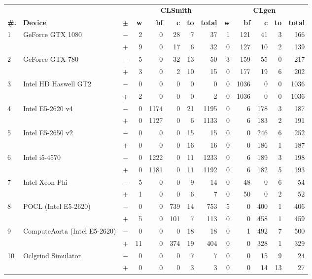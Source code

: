   \begin{tabular}{lll | rrrrr | rrrrr }
  \toprule
  & & & \multicolumn{5}{c|}{\textbf{CLSmith}} & \multicolumn{5}{c}{\textbf{CLgen}} \\
  \textbf{\#.} & \textbf{Device} & $\pm$ &
  \textbf{w} & \textbf{bf} & \textbf{c} & \textbf{to} & \textbf{total} &
  \textbf{w} & \textbf{bf} & \textbf{c} & \textbf{to} & \textbf{total} \\
  \midrule
  \multirow{ 2}{*}{1} & \multirow{ 2}{*}{GeForce GTX 1080} & $-$ & 2 & 0 & 28 & 7 & 37       & 1 & 121 & 41 & 3 & 166 \\& & $+$ & 9 & 0 & 17 & 6 & 32 & 0 & 127 & 10 & 2 & 139 \\
\hline
\multirow{ 2}{*}{2} & \multirow{ 2}{*}{GeForce GTX 780} & $-$ & 5 & 0 & 32 & 13 & 50       & 3 & 159 & 55 & 0 & 217 \\& & $+$ & 3 & 0 & 2 & 10 & 15 & 0 & 177 & 19 & 6 & 202 \\
\hline
\multirow{ 2}{*}{3} & \multirow{ 2}{*}{Intel HD Haswell GT2} & $-$ & 0 & 0 & 0 & 0 & 0       & 0 & 1036 & 0 & 0 & 1036 \\& & $+$ & 2 & 0 & 0 & 0 & 2 & 0 & 1036 & 0 & 0 & 1036 \\
\hline
\multirow{ 2}{*}{4} & \multirow{ 2}{*}{Intel E5-2620 v4} & $-$ & 0 & 1174 & 0 & 21 & 1195       & 0 & 6 & 178 & 3 & 187 \\& & $+$ & 0 & 1127 & 0 & 6 & 1133 & 0 & 6 & 183 & 2 & 191 \\
\hline
\multirow{ 2}{*}{5} & \multirow{ 2}{*}{Intel E5-2650 v2} & $-$ & 0 & 0 & 0 & 15 & 15       & 0 & 0 & 246 & 6 & 252 \\& & $+$ & 0 & 0 & 0 & 16 & 16 & 0 & 0 & 186 & 1 & 187 \\
\hline
\multirow{ 2}{*}{6} & \multirow{ 2}{*}{Intel i5-4570} & $-$ & 0 & 1222 & 0 & 11 & 1233       & 0 & 6 & 189 & 3 & 198 \\& & $+$ & 0 & 1181 & 0 & 11 & 1192 & 0 & 6 & 182 & 5 & 193 \\
\hline
\multirow{ 2}{*}{7} & \multirow{ 2}{*}{Intel Xeon Phi} & $-$ & 5 & 0 & 0 & 9 & 14       & 0 & 48 & 0 & 6 & 54 \\& & $+$ & 1 & 0 & 0 & 6 & 7 & 0 & 50 & 0 & 2 & 52 \\
\hline
\multirow{ 2}{*}{8} & \multirow{ 2}{*}{POCL (Intel E5-2620)} & $-$ & 0 & 0 & 739 & 14 & 753       & 5 & 0 & 400 & 1 & 406 \\& & $+$ & 5 & 0 & 101 & 7 & 113 & 0 & 0 & 458 & 1 & 459 \\
\hline
\multirow{ 2}{*}{9} & \multirow{ 2}{*}{ComputeAorta (Intel E5-2620)} & $-$ & 0 & 0 & 0 & 18 & 18       & 0 & 1 & 492 & 7 & 500 \\& & $+$ & 11 & 0 & 374 & 19 & 404 & 0 & 0 & 328 & 1 & 329 \\
\hline
\multirow{ 2}{*}{10} & \multirow{ 2}{*}{Oclgrind Simulator} & $-$ & 0 & 0 & 0 & 7 & 7       & 0 & 0 & 15 & 9 & 24 \\& & $+$ & 0 & 0 & 0 & 3 & 3 & 0 & 0 & 14 & 13 & 27 \\
  \bottomrule
\end{tabular}

